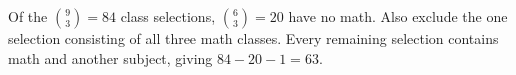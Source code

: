Of the $\binom 93=84$ class selections, $\binom 63=20$ have no math. Also exclude the one selection consisting of all three math classes. Every remaining selection contains math and another subject, giving $84-20-1=\boxed{63}$.
